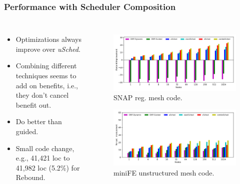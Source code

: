 {\begin{frame}[label=perfComp]
\frametitle{Performance with Scheduler Composition} 
\vspace*{-0.13in}
\begin{columns}
\begin{itemize}
\small \item \small Optimizations always improve over \textit{uSched}. 
\item \small Combining different techniques seems to add on benefits, i.e., they don't cancel benefit out. 
\item \small Do better than guided. 
\item \small Small code change, e.g., 41,421 loc to 41,982 loc (5.2\%) for Rebound. 
\end{itemize}
\begin{figure}[ht] 
\begin{center} 
\includegraphics[scale=0.18]{./plots/app-scaling-strat-SNAP-fastNUMA2}\\
\vspace*{-0.16in}
{\tiny SNAP reg. mesh code.}
\end{center}

\begin{center}
\includegraphics[scale=0.18]{./plots/app-scaling-strat-fe-fastNUMA2}\\
\vspace*{-0.16in}
{\tiny miniFE unstructured mesh code.}
\end{center}


\end{figure}
\end{columns}
\end{frame}}
